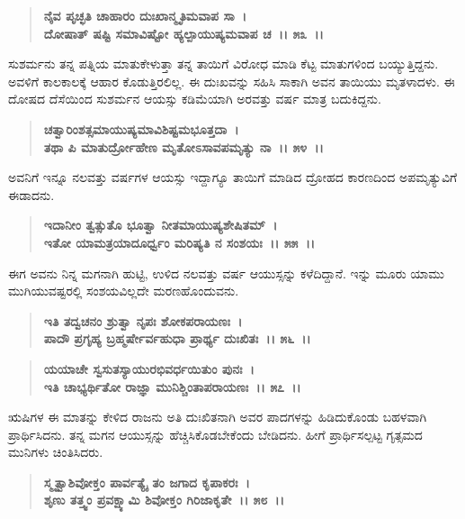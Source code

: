 \begin{verse}
\textbf{ನೈವ ಪೃಚ್ಛತಿ ಚಾಹಾರಂ ದುಃಖಾನ್ಮೃತಿಮವಾಪ ಸಾ~।}\\\textbf{ದೋಷಾತ್ ಷಷ್ಟಿ ಸಮಾವಿಷ್ಟೋ ಹ್ಯಲ್ಪಾಯುಷ್ಯಮವಾಪ ಚ~।। ೫೩~।।}
\end{verse}

ಸುಶರ್ಮನು ತನ್ನ ಪತ್ನಿಯ ಮಾತುಕೇಳುತ್ತಾ ತನ್ನ ತಾಯಿಗೆ ವಿರೋಧ ಮಾಡಿ ಕೆಟ್ಟ ಮಾತುಗಳಿಂದ ಬಯ್ಯುತ್ತಿದ್ದನು. ಅವಳಿಗೆ ಕಾಲಕಾಲಕ್ಕೆ ಆಹಾರ ಕೊಡುತ್ತಿರಲಿಲ್ಲ. ಈ ದುಃಖವನ್ನು ಸಹಿಸಿ ಸಾಕಾಗಿ ಅವನ ತಾಯಿಯು ಮೃತಳಾದಳು. ಈ ದೋಷದ ದೆಸೆಯಿಂದ ಸುಶರ್ಮನ ಆಯಸ್ಸು ಕಡಿಮೆಯಾಗಿ ಅರವತ್ತು ವರ್ಷ ಮಾತ್ರ ಬದುಕಿದ್ದನು.

\begin{verse}
\textbf{ಚತ್ವಾರಿಂಶತ್ಸಮಾಯುಷ್ಯಮಾವಿಶಿಷ್ಟಮಭೂತ್ತದಾ~।}\\\textbf{ತಥಾ ಪಿ ಮಾತುರ್ದ್ರೋಹೇಣ ಮೃತೋಽಸಾವಪಮೃತ್ಯು ನಾ~।। ೫೪~।।}
\end{verse}

ಅವನಿಗೆ ಇನ್ನೂ ನಲವತ್ತು ವರ್ಷಗಳ ಆಯಸ್ಸು ಇದ್ದಾಗ್ಯೂ ತಾಯಿಗೆ ಮಾಡಿದ ದ್ರೋಹದ ಕಾರಣದಿಂದ ಅಪಮೃತ್ಯುವಿಗೆ ಈಡಾದನು.

\begin{verse}
\textbf{ಇದಾನೀಂ ತ್ವತ್ಸುತೊ ಭೂತ್ವಾ ನೀತಮಾಯುಷ್ಯಶೇಷಿತಮ್~।}\\\textbf{ಇತೋ ಯಾಮತ್ರಯಾದೂರ್ಧ್ವಂ ಮರಿಷ್ಯತಿ ನ ಸಂಶಯಃ~।। ೫೫~।।}
\end{verse}

ಈಗ ಅವನು ನಿನ್ನ ಮಗನಾಗಿ ಹುಟ್ಟಿ, ಉಳಿದ ನಲವತ್ತು ವರ್ಷ ಆಯುಸ್ಸನ್ನು ಕಳೆದಿದ್ದಾನೆ. ಇನ್ನು ಮೂರು ಯಾಮು ಮುಗಿಯುವಷ್ಟರಲ್ಲಿ ಸಂಶಯವಿಲ್ಲದೇ ಮರಣಹೊಂದುವನು.

\begin{verse}
\textbf{ಇತಿ ತದ್ವಚನಂ ಶ್ರುತ್ವಾ ನೃಪಃ ಶೋಕಪರಾಯಣಃ~।}\\\textbf{ಪಾದೌ ಪ್ರಗೃಹ್ಯ ಬ್ರಹ್ಮರ್ಷೇರ್ವಹುಧಾ ಪ್ರಾರ್ಥ್ಯ ದುಃಖಿತಃ~।। ೫೬~।। }
\end{verse}

\begin{verse}
\textbf{ಯಯಾಚೇ ಸ್ವಸುತಸ್ಯಾಯುರಭಿವರ್ಧಯಿತುಂ ಪುನಃ~।}\\\textbf{ಇತಿ ಚಾಭ್ಯರ್ಥಿತೋ ರಾಜ್ಞಾ ಮುನಿಶ್ಚಿಂತಾಪರಾಯಣಃ~।। ೫೭~।।}
\end{verse}

ಋಷಿಗಳ ಈ ಮಾತನ್ನು ಕೇಳಿದ ರಾಜನು ಅತಿ ದುಃಖಿತನಾಗಿ ಅವರ ಪಾದಗಳನ್ನು ಹಿಡಿದುಕೊಂಡು ಬಹಳವಾಗಿ ಪ್ರಾರ್ಥಿಸಿದನು. ತನ್ನ ಮಗನ ಆಯುಸ್ಸನ್ನು ಹೆಚ್ಚಿಸಿಕೊಡಬೇಕೆಂದು ಬೇಡಿದನು. ಹೀಗೆ ಪ್ರಾರ್ಥಿಸಲ್ಪಟ್ಟ ಗೃತ್ಸಮದ ಮುನಿಗಳು ಚಿಂತಿಸಿದರು.

\begin{verse}
\textbf{ಸ್ಮೃತ್ವಾಶಿವೋಕ್ತಂ ಪಾರ್ವತ್ಯೈ ತಂ ಜಗಾದ ಕೃಪಾಕರಃ~।}\\\textbf{ಶೃಣು ತತ್ತ್ವಂ ಪ್ರವಕ್ಷ್ಯಾಮಿ ಶಿವೋಕ್ತಂ ಗಿರಿಜಾಕೃತೇ~।। ೫೮~।।}
\end{verse}

